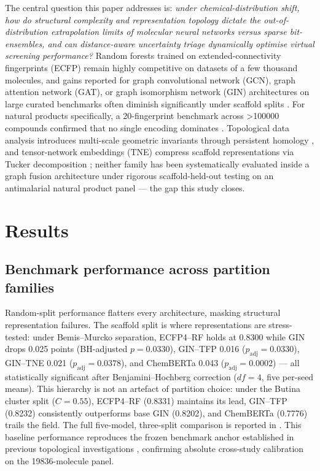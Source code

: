 \documentclass[11pt,a4paper]{article}
\begin{document}
The central question this paper addresses is: \emph{under chemical-distribution shift, how do structural complexity and representation topology dictate the out-of-distribution extrapolation limits of molecular neural networks versus sparse bit-ensembles, and can distance-aware uncertainty triage dynamically optimise virtual screening performance?} Random forests trained on extended-connectivity fingerprints (ECFP) remain highly competitive on datasets of a few thousand molecules, and gains reported for graph convolutional network (GCN), graph attention network (GAT), or graph isomorphism network (GIN) architectures on large curated benchmarks often diminish significantly under scaffold splits \citep{guo_ding_2026,wu_molnet_2018,benchmark_pretrained_2025}. For natural products specifically, a \num{20}-fingerprint benchmark across \num{>100000} compounds confirmed that no single encoding dominates \citep{boldini2024}. Topological data analysis introduces multi-scale geometric invariants through persistent homology \citep{tda_review_2025,su2026tdlreview,docal2026tdlvs}, and tensor-network embeddings (TNE) compress scaffold representations via Tucker decomposition \citep{tn_efficient_2026}; neither family has been systematically evaluated inside a graph fusion architecture under rigorous scaffold-held-out testing on an antimalarial natural product panel --- the gap this study closes.

\section{Results}

\subsection{Benchmark performance across partition families}

Random-split performance flatters every architecture, masking structural representation failures. The scaffold split is where representations are stress-tested: under Bemis--Murcko separation, ECFP4--RF holds at \num{0.8300} while GIN drops \num{0.025} points (BH-adjusted $p = \num{0.0330}$), GIN--TFP \num{0.016} ($p_{\text{adj}} = \num{0.0330}$), GIN--TNE \num{0.021} ($p_{\text{adj}} = \num{0.0378}$), and ChemBERTa \num{0.043} ($p_{\text{adj}} = \num{0.0002}$) --- all statistically significant after Benjamini--Hochberg correction ($df=\num{4}$, five per-seed means). This hierarchy is not an artefact of partition choice: under the Butina cluster split ($C=\num{0.55}$), ECFP4--RF (\num{0.8331}) maintains its lead, GIN--TFP (\num{0.8232}) consistently outperforms base GIN (\num{0.8202}), and ChemBERTa (\num{0.7776}) trails the field. The full five-model, three-split comparison is reported in . This baseline performance reproduces the frozen benchmark anchor established in previous topological investigations \citep{temgoua2027quantum}, confirming absolute cross-study calibration on the \num{19836}-molecule panel.
\end{document}
